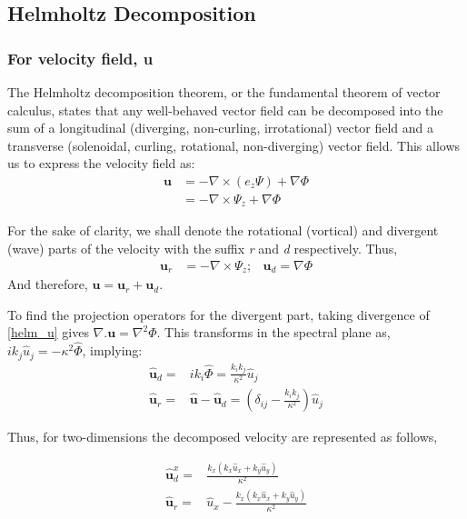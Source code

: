\subsection{Helmholtz Decomposition}
\subsubsection{For velocity field, u}
The Helmholtz decomposition theorem, or the fundamental theorem of vector
calculus,
states that any well-behaved vector field can be decomposed into
the sum of a longitudinal (diverging, non-curling, irrotational) vector field
and
a transverse (solenoidal, curling, rotational, non-diverging) vector field.
This allows us to express the velocity field as:
\begin{align}
    \label{helm_u}
    \mathbf u & = -\nabla \times (e_z \Psi) + \nabla \Phi \\
              & =  -\nabla \times \Psi_z + \nabla \Phi
\end{align}

For the sake of clarity,
we shall denote the rotational (vortical) and divergent (wave) parts of the
velocity with the suffix \emph{r} and \emph{d} respectively. Thus,
\begin{align}
    \mathbf u_r & = -\nabla \times \Psi_z ; & \mathbf u_d =   \nabla \Phi
\end{align}
And therefore, $\mathbf u  = \mathbf u_r + \mathbf u_d$.

To find the projection operators for the divergent part, taking divergence of
\eqref{helm_u} gives $\nabla .\mathbf{u} = \nabla^2 \Phi
$.
This transforms in the spectral plane as, $ik_j \hat{u}_j = -\kappa^2
    \hat{\Phi}$, implying:
\begin{align}
    \mathbf{\hat{u}}_d = & ik_i \hat{\Phi} = \frac{k_i k_j}{\kappa^2} \hat{u}_j       \\
    \mathbf{\hat{u}}_r = & \mathbf{\hat{u}} - \mathbf{\hat{u}}_d = \left( \delta_{ij}
    - \frac{k_i k_j}{\kappa^2} \right) \hat{u}_j
\end{align}

Thus, for two-dimensions the decomposed velocity are represented as follows,

\begin{align}
    \mathbf{\hat{u}}_d^x = & \frac{k_x (k_x \hat{u}_x + k_y \hat{u}_y)}{\kappa^2}                \\
    \mathbf{\hat{u}}_r =   & \hat{u}_{x} - \frac{k_x  (k_x \hat{u}_x + k_y \hat{u}_y)}{\kappa^2}
\end{align}

